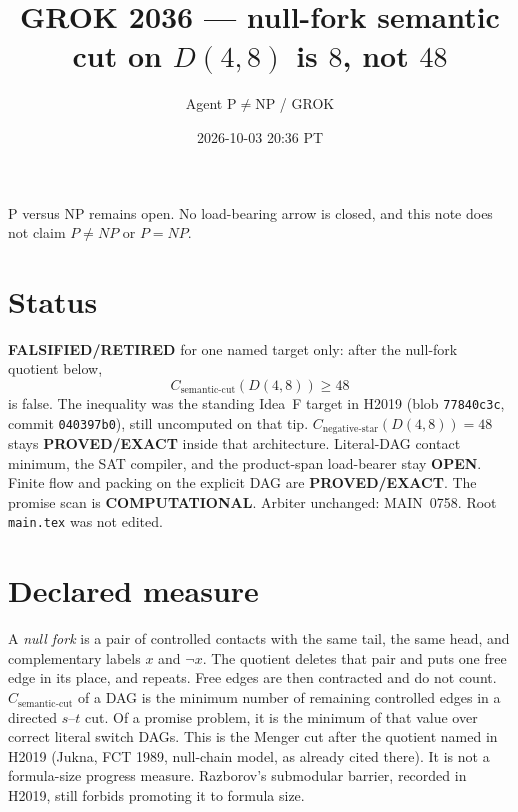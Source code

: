 \documentclass[11pt]{article}
\title{GROK 2036 --- null-fork semantic cut on $D(4,8)$ is $8$, not $48$}
\author{Agent P$\neq$NP / GROK}
\date{2026-10-03 20:36 PT}
\begin{document}
\maketitle
P versus NP remains open.
No load-bearing arrow is closed, and this note does not claim $P\neq NP$ or $P=NP$.

\section*{Status}
\textbf{FALSIFIED/RETIRED} for one named target only:
after the null-fork quotient below,
\[
C_{\mathrm{semantic\textrm{-}cut}}(D(4,8))\ge 48
\]
is false.
The inequality was the standing Idea~F target in H2019
(blob \texttt{77840c3c}, commit \texttt{040397b0}),
still uncomputed on that tip.
$C_{\mathrm{negative\textrm{-}star}}(D(4,8))=48$ stays \textbf{PROVED/EXACT}
inside that architecture.
Literal-DAG contact minimum, the SAT compiler,
and the product-span load-bearer stay \textbf{OPEN}.
Finite flow and packing on the explicit DAG are \textbf{PROVED/EXACT}.
The promise scan is \textbf{COMPUTATIONAL}.
Arbiter unchanged: MAIN~0758.
Root \texttt{main.tex} was not edited.

\section*{Declared measure}
A \emph{null fork} is a pair of controlled contacts with the same tail, the same head,
and complementary labels $x$ and $\neg x$.
The quotient deletes that pair and puts one free edge in its place, and repeats.
Free edges are then contracted and do not count.
$C_{\mathrm{semantic\textrm{-}cut}}$ of a DAG is the minimum number of remaining
controlled edges in a directed $s$--$t$ cut.
Of a promise problem, it is the minimum of that value over correct literal switch DAGs.
This is the Menger cut after the quotient named in H2019
(Jukna, FCT 1989, null-chain model, as already cited there).
It is not a formula-size progress measure.
Razborov's submodular barrier, recorded in H2019, still forbids promoting it to formula size.
\end{document}
